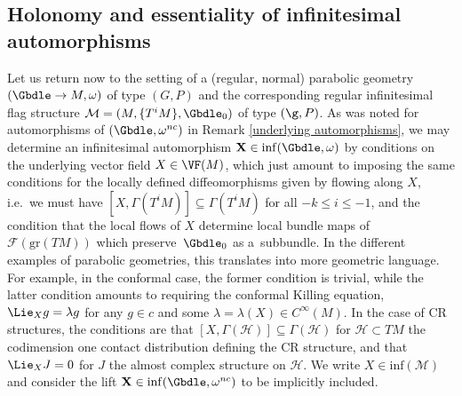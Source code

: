 \subsection{Holonomy and essentiality of inf\/initesimal automorphisms}\label{section4.2}

Let us return now to the setting of a (regular, normal) parabolic geometry $(\Gbdle \rightarrow M,\omega)$ of type $(G,P)$ and the corresponding regular inf\/initesimal f\/lag structure $\mathcal{M} = (M,\{T^iM\},\Gbdle_0)$ of type $(\g,P)$. As was noted for automorphisms of $(\Gbdle,\omega^{nc})$ in Remark \ref{underlying automorphisms}, we may determine an inf\/initesimal automorphism $\mathbf{X} \in \mathrm{inf}(\Gbdle,\omega)$ by conditions on the underlying vector f\/ield $X \in \VF(M)$, which just amount to imposing the same conditions for the locally def\/ined dif\/feomorphisms given by f\/lowing along $X$, i.e.\ we must have $[X,\Gamma(T^iM)] \subseteq \Gamma(T^iM)$ for all $-k \leq i \leq -1$, and the condition that the local f\/lows of $X$ determine local bundle maps of $\mathcal{F}(\mathrm{gr}(TM))$ which preserve~$\Gbdle_0$ as a~subbundle. In the dif\/ferent examples of parabolic geometries, this translates into more geometric language. For example, in the conformal case, the former condition is trivial, while the latter condition amounts to requiring the conformal Killing equation, $\Lie_X g = \lambda g$ for any $g \in c$ and some $\lambda = \lambda(X) \in C^{\infty}(M)$. In the case of CR structures, the conditions are that $[X,\Gamma(\mathcal{H})] \subseteq \Gamma(\mathcal{H})$ for $\mathcal{H} \subset TM$ the codimension one contact distribution def\/ining the CR structure, and that $\Lie_X J = 0$ for $J$ the almost complex structure on $\mathcal{H}$. We write $X \in \mathrm{inf}(\mathcal{M})$ and consider the lift $\mathbf{X} \in \mathrm{inf}(\Gbdle,\omega^{nc})$ to be implicitly included.

